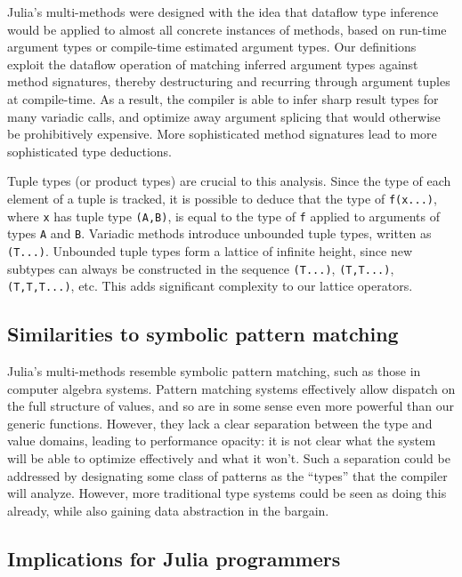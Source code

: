 \documentclass[preprint]{sigplanconf}
\newcommand{\code}[1]{\texttt{#1}}
\begin{document}
Julia's multi-methods were designed with the idea that dataflow type inference
would be applied to almost all concrete instances of methods, based on
run-time argument types or compile-time estimated argument types.
Our definitions exploit the dataflow operation of matching inferred argument types
against method signatures, thereby destructuring and recurring through argument
tuples at compile-time. As a result, the compiler is able to infer sharp result
types for many variadic calls, and optimize away argument splicing that would otherwise
be prohibitively expensive. More sophisticated method signatures lead to more
sophisticated type deductions.

Tuple types (or product types) are crucial to this analysis. Since the type
of each element of a tuple is tracked, it is possible to deduce that
the type of \code{f(x...)}, where \code{x} has tuple type \code{(A,B)}, is
equal to the type of \code{f} applied to arguments of types \code{A} and
\code{B}. Variadic methods introduce unbounded tuple types, written as
\code{(T...)}. Unbounded tuple types form a lattice of infinite height,
since new subtypes can always be constructed in the sequence
\code{(T...)}, \code{(T,T...)}, \code{(T,T,T...)}, etc. This adds
significant complexity to our lattice operators.

\subsection{Similarities to symbolic pattern matching}

Julia's multi-methods resemble symbolic pattern matching, such as those in
computer algebra systems. Pattern matching systems effectively
allow dispatch on the full structure of values, and so are in some sense
even more powerful than our generic functions. However, they lack a clear
separation between the type and value domains, leading to performance
opacity: it is not clear what the system will be able to optimize
effectively and what it won't.
Such a separation could be addressed by
designating some class of patterns as the ``types'' that the compiler
will analyze. However, more traditional type systems could be seen as
doing this already, while also gaining data abstraction in the bargain.

\subsection{Implications for Julia programmers}
\end{document}

